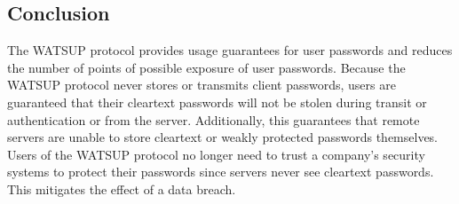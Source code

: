 \subsection{Conclusion}

The WATSUP protocol provides usage guarantees for user passwords and reduces the number of points of possible exposure of user passwords. Because the WATSUP protocol never stores or transmits client passwords, users are guaranteed that their cleartext passwords will not be stolen during transit or authentication or from the server. Additionally, this guarantees that remote servers are unable to store cleartext or weakly protected passwords themselves. Users of the WATSUP protocol no longer need to trust a company's security systems to protect their passwords since servers never see cleartext passwords. This mitigates the effect of a data breach.
